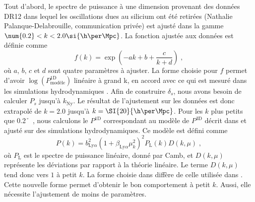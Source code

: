 Tout d'abord, le spectre de puissance à une dimension provenant des données DR12 dans lequel les oscillations dues au silicium ont été retirées (Nathalie Palanque-Delabrouille, communication privée) est ajusté dans la gamme $\num{0.2} < k < {2.0} \si{\h\per\Mpc}$.
La fonction ajustée aux données est définie comme
\begin{equation}
  \label{eq:p1d_data}
  f(k) = \exp(- a k + b + \frac{c}{k + d})  \; ,
\end{equation}
où $a$, $b$, $c$ et $d$ sont quatre paramètres à ajuster.
La forme choisie pour $f$ permet d'avoir $\log(P^{\mathrm{1D}}_{\mathrm{modèle}})$ linéaire à grand k, en accord avec ce qui est mesuré dans les simulations hydrodynamiques \autocite{Arinyo-i-Prats2015}.
Afin de construire $\delta_s$, nous avons besoin de calculer $P_{s}$ jusqu'à $k_{\mathrm{Ny}}$.
Le résultat de l'ajustement sur les données est donc extrapolé de $k = \num{2.0}$ jusqu'à $k = \SI{20}{\h\per\Mpc}$.
Pour les $k$ plus petits que \SI{0.2}{\h\per\Mpc}, nous calculons le $P^{\mathrm{1D}}$ correspondant au modèle de $P^{\mathrm{3D}}$ décrit dans \textcite{Arinyo-i-Prats2015} et ajusté sur des simulations hydrodynamiques.
Ce modèle est défini comme
\begin{equation}
  P(k) = b_{\mathrm{Ly}\alpha}^2 (1 + \beta_{\mathrm{Ly}\alpha} \mu_k^2)^2 P_{\mathrm{L}}(k) D(k, \mu) \; ,
\end{equation}
où $P_{\mathrm{L}}$ est le spectre de puissance linéaire, donné par Camb, et $D(k,\mu)$ représente les déviations par rapport à la théorie linéaire. Le terme $D(k,\mu)$ tend donc vers $1$ à petit $k$. La forme choisie dans \textcite{Arinyo-i-Prats2015} diffère de celle utilisée dans \textcite{McDonald2003}. Cette nouvelle forme permet d'obtenir le bon comportement à petit $k$. Aussi, elle nécessite l'ajustement de moins de paramètres.
